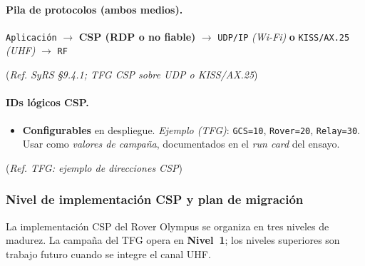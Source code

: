 \paragraph{Pila de protocolos (ambos medios).}
\begin{center}
  \small \verb|Aplicación| $\rightarrow$ \textbf{CSP (RDP o no fiable)} $\rightarrow$
  \verb|UDP/IP| \emph{(Wi-Fi)} \textbf{o} \verb|KISS/AX.25| \emph{(UHF)} $\rightarrow$ \verb|RF|
\end{center}
(\emph{Ref. SyRS §9.4.1; TFG CSP sobre UDP o KISS/AX.25})%

\paragraph{IDs lógicos CSP.}
\begin{itemize}
  \item \textbf{Configurables} en despliegue. \emph{Ejemplo (TFG)}: \texttt{GCS=10}, \texttt{Rover=20}, \texttt{Relay=30}.
        Usar como \emph{valores de campaña}, documentados en el \emph{run card} del ensayo.
\end{itemize}
(\emph{Ref. TFG: ejemplo de direcciones CSP})%

\subsubsection{Nivel de implementación CSP y plan de migración}
\label{sssec:icd_comms_csp_level}

La implementación CSP del Rover Olympus se organiza en tres niveles de madurez.
La campaña del TFG opera en \textbf{Nivel~1}; los niveles superiores son trabajo futuro
cuando se integre el canal UHF.

